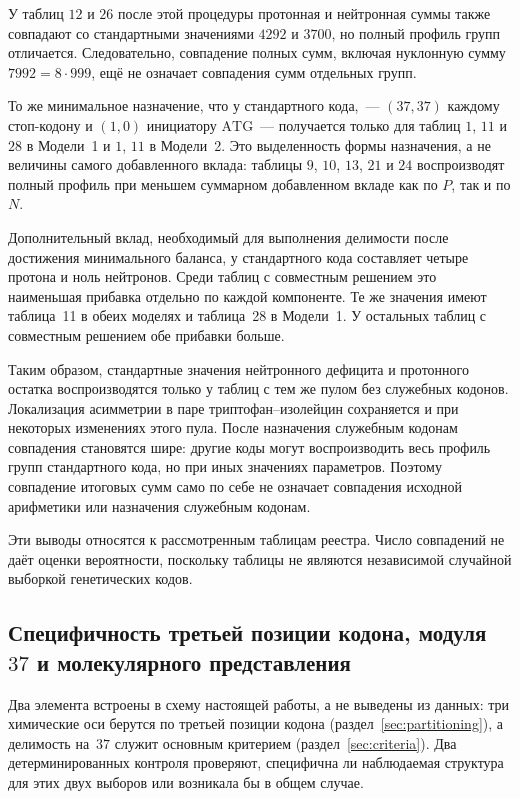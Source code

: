 \documentclass[11pt,a4paper]{article}
\renewcommand{\_}{\origunderscore\allowbreak}
\begin{document}
У таблиц $12$ и $26$ после этой процедуры протонная
и нейтронная суммы также совпадают со стандартными
значениями $4292$ и $3700$, но полный профиль групп
отличается. Следовательно, совпадение полных сумм,
включая нуклонную сумму $7992=8\cdot999$, ещё
не означает совпадения сумм отдельных групп.

То же минимальное назначение, что у стандартного
кода,~--- $(37,37)$ каждому стоп-кодону и $(1,0)$
инициатору $\mathrm{ATG}$~--- получается только
для таблиц $1$, $11$ и $28$ в Модели~1 и
$1$, $11$ в Модели~2. Это выделенность формы
назначения, а не величины самого добавленного
вклада: таблицы $9$, $10$, $13$, $21$ и $24$
воспроизводят полный профиль при меньшем суммарном
добавленном вкладе как по $P$, так и по $N$.

Дополнительный вклад, необходимый для выполнения
делимости после достижения минимального баланса,
у стандартного кода составляет четыре протона
и ноль нейтронов. Среди таблиц с совместным решением
это наименьшая прибавка отдельно по каждой компоненте.
Те же значения имеют таблица~11 в обеих моделях
и таблица~28 в Модели~1. У остальных таблиц
с совместным решением обе прибавки больше.

Таким образом, стандартные значения нейтронного
дефицита и протонного остатка воспроизводятся
только у таблиц с тем же пулом без служебных кодонов.
Локализация асимметрии в паре триптофан--изолейцин
сохраняется и при некоторых изменениях этого пула.
После назначения служебным кодонам совпадения
становятся шире: другие коды могут воспроизводить
весь профиль групп стандартного кода, но при иных
значениях параметров. Поэтому совпадение итоговых
сумм само по себе не означает совпадения исходной
арифметики или назначения служебным кодонам.

Эти выводы относятся к рассмотренным таблицам
реестра. Число совпадений не даёт оценки вероятности,
поскольку таблицы не являются независимой случайной
выборкой генетических кодов.

\subsection{Специфичность третьей позиции кодона, модуля~\texorpdfstring{$37$}{37} и молекулярного представления}
\label{sec:discussion-controls}

Два элемента встроены в схему настоящей работы, а не выведены из
данных: три химические оси берутся по третьей позиции кодона
(раздел~\ref{sec:partitioning}), а делимость на~$37$ служит
основным критерием (раздел~\ref{sec:criteria}). Два
детерминированных контроля проверяют, специфична ли наблюдаемая
структура для этих двух выборов или возникала бы в общем случае.
\end{document}
